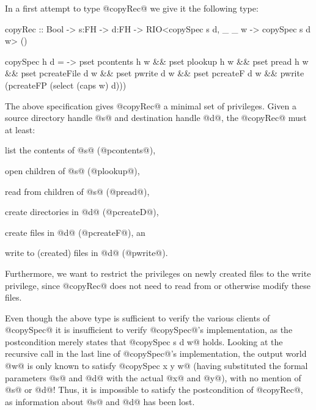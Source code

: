 In a first attempt to type @copyRec@ we give it the following type:
\begin{code}
  copyRec :: Bool -> s:FH -> d:FH ->
             RIO<copySpec s d,
                 \_ _ w -> copySpec s d w> () 

 copySpec h d = \w ->
   pset pcontents h w && pset plookup h     w &&
   pset pread h     w && pset pcreateFile d w &&
   pset pwrite d    w && pset pcreateF d    w &&
   pwrite (pcreateFP (select (caps w) d)))
\end{code}              
%
The above specification gives @copyRec@ a minimal set of privileges. 
%
Given a source directory handle @s@ and destination handle @d@, the
@copyRec@ must at least:
%
\begin{inparaenum}[(1)]
  \item list the contents of @s@ (@pcontents@),
  \item open children of @s@ (@plookup@),
  \item read from children of @s@ (@pread@),
  \item create directories in @d@ (@pcreateD@),
  \item create files in @d@ (@pcreateF@), an
  \item write to (created) files in @d@ (@pwrite@).
\end{inparaenum}
%
Furthermore, we want to restrict the privileges on newly created files
to the write privilege, since @copyRec@ does not need to read from or
otherwise modify these files.

Even though the above type is sufficient to verify
the various clients of @copySpec@ it
is insufficient to verify @copySpec@'s implementation, 
as the postcondition merely states that @copySpec s d w@ holds.
%
Looking at the recursive call in the last line of @copySpec@'s implementation,
the output world @w@ is only known to satisfy @copySpec x y w@ (having
substituted the formal parameters @s@ and @d@ with the actual @x@ and
@y@), with no mention of @s@ or @d@!
%
Thus, it is impossible to satisfy the postcondition of @copyRec@, as
information about @s@ and @d@ has been lost.


